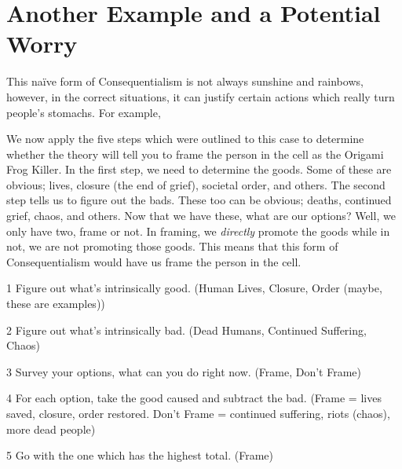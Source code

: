 \section{Another Example and a Potential Worry} 
This na\"ive form of Consequentialism is not always sunshine and rainbows, however, in the correct situations, it can justify certain actions which really turn people's stomachs. For example,



We now apply the five steps which were outlined to this case to determine whether the theory will tell you to frame the person in the cell as the Origami Frog Killer. In the first step, we need to determine the goods. Some of these are obvious; lives, closure (the end of grief), societal order, and others. The second step tells us to figure out the bads. These too can be obvious; deaths, continued grief, chaos, and others. Now that we have these, what are our options? Well, we only have two, frame or not. In framing, we \emph{directly} promote the goods while in not, we are not promoting those goods. This means that this form of Consequentialism would have us frame the person in the cell. 

\begin{earg}
    \item[1] Figure out what’s intrinsically good. (Human Lives, Closure, Order (maybe, these are examples))
    \item[2] Figure out what’s intrinsically bad. (Dead Humans, Continued Suffering, Chaos)
    \item[3] Survey your options, what can you do right now. (Frame, Don’t Frame)
    \item[4] For each option, take the good caused and subtract the bad. (Frame = lives saved, closure, order restored. Don’t Frame = continued suffering, riots (chaos), more dead people)
    \item[5] Go with the one which has the highest total. (Frame)
\end{earg}

